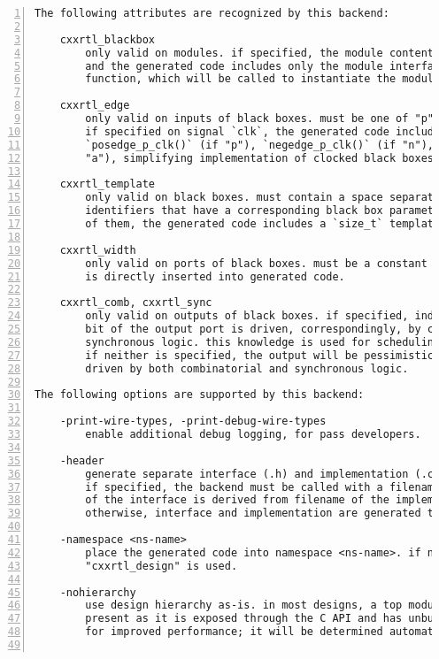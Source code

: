 \begin{lstlisting}[numbers=left,frame=single]
The following attributes are recognized by this backend:

    cxxrtl_blackbox
        only valid on modules. if specified, the module contents are ignored,
        and the generated code includes only the module interface and a factory
        function, which will be called to instantiate the module.

    cxxrtl_edge
        only valid on inputs of black boxes. must be one of "p", "n", "a".
        if specified on signal `clk`, the generated code includes edge detectors
        `posedge_p_clk()` (if "p"), `negedge_p_clk()` (if "n"), or both (if
        "a"), simplifying implementation of clocked black boxes.

    cxxrtl_template
        only valid on black boxes. must contain a space separated sequence of
        identifiers that have a corresponding black box parameters. for each
        of them, the generated code includes a `size_t` template parameter.

    cxxrtl_width
        only valid on ports of black boxes. must be a constant expression, which
        is directly inserted into generated code.

    cxxrtl_comb, cxxrtl_sync
        only valid on outputs of black boxes. if specified, indicates that every
        bit of the output port is driven, correspondingly, by combinatorial or
        synchronous logic. this knowledge is used for scheduling optimizations.
        if neither is specified, the output will be pessimistically treated as
        driven by both combinatorial and synchronous logic.

The following options are supported by this backend:

    -print-wire-types, -print-debug-wire-types
        enable additional debug logging, for pass developers.

    -header
        generate separate interface (.h) and implementation (.cc) files.
        if specified, the backend must be called with a filename, and filename
        of the interface is derived from filename of the implementation.
        otherwise, interface and implementation are generated together.

    -namespace <ns-name>
        place the generated code into namespace <ns-name>. if not specified,
        "cxxrtl_design" is used.

    -nohierarchy
        use design hierarchy as-is. in most designs, a top module should be
        present as it is exposed through the C API and has unbuffered outputs
        for improved performance; it will be determined automatically if absent.


\end{lstlisting}
